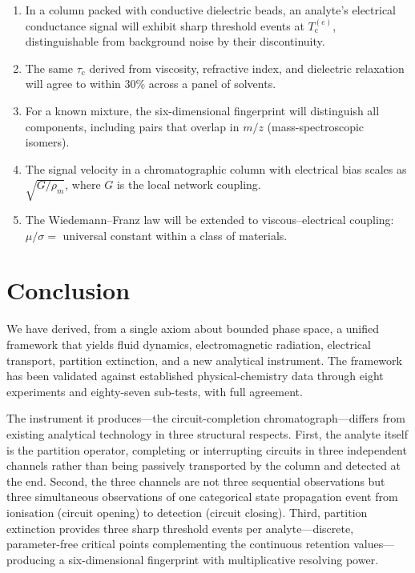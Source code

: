 \documentclass[twocolumn,10pt,a4paper]{article}
\theoremstyle{definition}
\theoremstyle{remark}
\newcommand{\tauC}{\tau_{\mathrm{c}}}
\newcommand{\TcE}{T_{\mathrm{c}}^{(e)}}
\begin{document}
\begin{enumerate}[leftmargin=1.5em,nosep]
\item In a column packed with conductive dielectric beads, an analyte's electrical conductance signal will exhibit sharp threshold events at $\TcE$, distinguishable from background noise by their discontinuity.

\item The same $\tauC$ derived from viscosity, refractive index, and dielectric relaxation will agree to within 30\% across a panel of solvents.

\item For a known mixture, the six-dimensional fingerprint will distinguish all components, including pairs that overlap in $m/z$ (mass-spectroscopic isomers).

\item The signal velocity in a chromatographic column with electrical bias scales as $\sqrt{G/\rho_m}$, where $G$ is the local network coupling.

\item The Wiedemann--Franz law will be extended to viscous--electrical coupling: $\mu/\sigma = $ universal constant within a class of materials.
\end{enumerate}

\section{Conclusion}
\label{sec:conclusion}

We have derived, from a single axiom about bounded phase space, a unified framework that yields fluid dynamics, electromagnetic radiation, electrical transport, partition extinction, and a new analytical instrument. The framework has been validated against established physical-chemistry data through eight experiments and eighty-seven sub-tests, with full agreement.

The instrument it produces---the circuit-completion chromatograph---differs from existing analytical technology in three structural respects. First, the analyte itself is the partition operator, completing or interrupting circuits in three independent channels rather than being passively transported by the column and detected at the end. Second, the three channels are not three sequential observations but three simultaneous observations of one categorical state propagation event from ionisation (circuit opening) to detection (circuit closing). Third, partition extinction provides three sharp threshold events per analyte---discrete, parameter-free critical points complementing the continuous retention values---producing a six-dimensional fingerprint with multiplicative resolving power.
\end{document}
